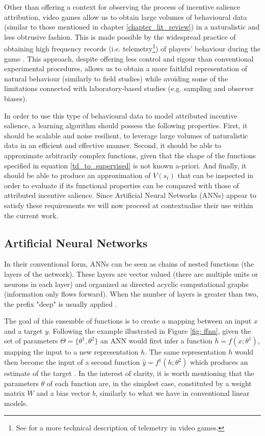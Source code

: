 Other than offering a context for observing the process of incentive salience attribution, video games allow us to obtain large volumes of behavioural data (similar to those mentioned in chapter \ref{chapter_lit_review}) in a naturalistic and  less obtrusive fashion. This is made possible by the widespread practice of obtaining high frequency records (i.e. telemetry\footnote{See \cite{el2016game} for a more technical description of telemetry in video games.}) of players' behaviour during the game \cite{drachen2015behavioral}. This approach, despite offering less control and rigour than conventional experimental procedures, allows us to obtain a more faithful representation of natural behaviour (similarly to field studies) while avoiding some of the limitations connected with laboratory-based studies (e.g. sampling and observer biases).

In order to use this type of behavioural data to model attributed incentive salience, a learning algorithm should possess the following properties. First, it should be scalable and noise resilient, to leverage large volumes of naturalistic data in an efficient and effective manner. Second, it should be able to approximate arbitrarily complex functions, given that the shape of the functions specified in equation \ref{td_to_supervised} is not known a-priori. And finally, it should be able to produce an approximation of $V(s_{t})$ that can be inspected in order to evaluate if its functional properties can be compared with those of attributed incentive salience. Since Artificial Neural Networks (ANNs) appear to satisfy these requirements we will now proceed at contextualise their use within the current work.

\subsection{Artificial Neural Networks}
\label{artificial_neural_networks}
In their conventional form, ANNs can be seen as chains of nested functions (the layers of the network). These layers are vector valued (there are multiple units or neurons in each layer) and organized as directed acyclic computational graphs (information only flows forward). When the number of layers is greater than two, the prefix "deep" is usually applied \cite{bengio2017deep}. 

The goal of this ensemble of functions is to create a mapping between an input $x$ and a target $y$. Following the example illustrated in Figure \ref{fig: ffnn}, given the set of parameters $\Theta = \{\theta^1, \theta^2 \}$ an ANN would first infer a function $h = f(x;\theta^{1})$, mapping the input to a new representation $h$. The same representation $h$ would then become the input of a second function $\widehat{y} = f^{1}(h;\theta^{2})$ which produces an estimate of the target \cite{bengio2017deep}. In the interest of clarity, it is worth mentioning that the parameters $\theta$ of each function are, in the simplest case, constituted by a weight matrix $W$ and a bias vector $b$, similarly to what we have in conventional linear models.

